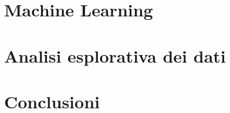 \documentclass[italian,12pt,a4paper]{article}
\begin{document}
	
	


	\section{Machine Learning}

	\section{Analisi esplorativa dei dati}

	\section{Conclusioni}
	

	
\end{document}
